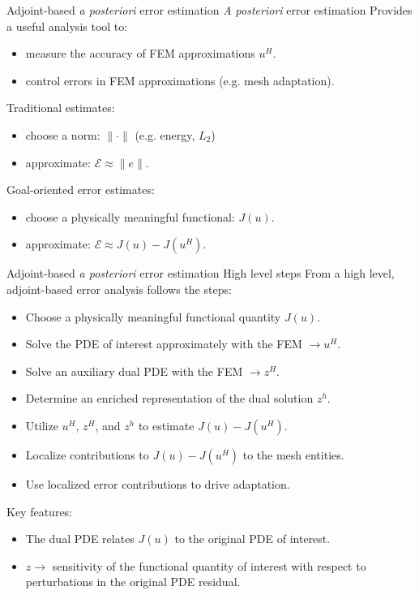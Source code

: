 \documentclass[fleqn]{beamer}
\begin{document}

\begin{frame}{Adjoint-based \emph{a posteriori} error estimation}
{\emph{A posteriori} error estimation}
Provides a useful analysis tool to:
\begin{itemize}
\item measure the accuracy of FEM approximations $u^H$.
\item control errors in FEM approximations (e.g. mesh adaptation).
\end{itemize}
Traditional estimates:
\begin{itemize}
\item choose a norm: $\| \cdot \|$ (e.g. energy, $L_2$)
\item approximate: $\mathcal{E} \approx \| e \|$.
\end{itemize}
Goal-oriented error estimates:
\begin{itemize}
\item choose a physically meaningful functional: $J(u)$.
\item approximate: $\mathcal{E} \approx J(u) - J(u^H)$.
\end{itemize}
\end{frame}


\begin{frame}{Adjoint-based \emph{a posteriori} error estimation}
{High level steps}
From a high level, adjoint-based error analysis follows the steps:
\begin{itemize}
\item Choose a physically meaningful functional quantity $J(u)$.
\item Solve the PDE of interest approximately with the FEM $\rightarrow u^H$.
\item Solve an auxiliary dual PDE with the FEM $\rightarrow z^H$.
\item Determine an enriched representation of the dual solution $z^h$.
\item Utilize $u^H$, $z^H$, and $z^h$ to estimate $J(u) - J(u^H)$.
\item Localize contributions to $J(u) - J(u^H)$ to the mesh entities.
\item Use localized error contributions to drive adaptation.
\end{itemize}
Key features:
\begin{itemize}
\item The dual PDE relates $J(u)$ to the original PDE of interest.
\item $z \rightarrow$ sensitivity of the functional quantity of
interest with respect to perturbations in the original PDE residual.
\end{itemize}
\end{frame}
\end{document}
